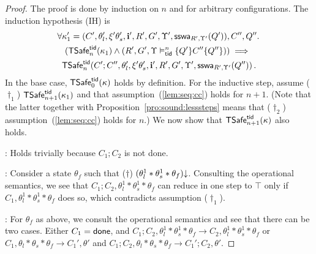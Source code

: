 \begin{proof}
The proof is done by induction on $n$ and for arbitrary configurations.
The induction hypothesis (IH)  is 
\begin{multline*}
  \forall \kappa_1' = 
  	(C',\theta'_l,\xi'\theta'_s,\intp',R',G',\Upsilon', \sswa{Q'}{R'}{\Upsilon'}),C'',Q''.\, \\ 
  (\safe_n(\kappa_1)  \land 
   (R', G' ,\Upsilon \vDash^n_{\ltid} \{Q'\} C'' \{Q''\}))\implies \mbox{} \\
   \safe_n(C';C'',\theta'_l,\xi'\theta'_s,\intp',R',G',\Upsilon', \sswa{Q''}{R'}{\Upsilon'})\,.
\end{multline*}
In the base case, $\safe_0(\kappa)$ holds by definition.
For the inductive step, 
assume 
($\dagger_1$) $\safe_{n+1}(\kappa_1)$   
and that assumption~(\ref{lem:seq:cc}) holds for $n+1$.
(Note that the latter together with Proposition~\ref{pro:sound:lesssteps} means that 
($\dag_2$) assumption~(\ref{lem:seq:cc}) holds for $n$.)
We now show that 
$\safe_{n+1}(\kappa)$ 
also holds.


:
Holds trivially because $C_1 ; C_2$ is  not \textsf{done}.


: 
Consider a state $\theta_f$ such that ($\dag$) $\consistent{\theta^1_l*\theta^1_s*\theta_f}$.
Consulting the operational semantics, we see that 
$C_1 ; C_2, \theta^1_l*\theta^1_s*\theta_f$  can reduce in one step to $\top$ only 
if $C_1, \theta^1_l*\theta^1_s*\theta_f$ does so,
which contradicts assumption ($\dagger_1$).

: 
For $\theta_f$ as above, we consult the operational semantics and see that
there can be two cases.
Either $C_1=\done$, 
and  
$C_1 ; C_2, \theta^1_l*\theta^1_s*\theta_f \rightarrow C_2,\theta^1_l*\theta^1_s*\theta_f$
or 
$C_1, \theta_l*\theta_s*\theta_f \rightarrow C_1',\theta'$
and 
$C_1;C_2, \theta_l*\theta_s*\theta_f \rightarrow C_1';C_2,\theta'$.


\end{proof}
